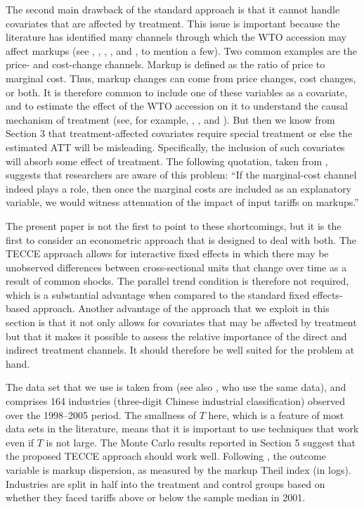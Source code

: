 \documentclass[12pt,fleqn]{article}
\begin{document}
  The second main drawback of the standard approach is that it cannot handle covariates that are affected by treatment. This issue is important because the literature has identified many channels through which the WTO accession may affect markups (see \citealp{Mao_Xu_2019}, \citealp{Fan_etal_2018}, \citealp{Deng_etal_2018}, \citealp{Liu_Ma_2021}, and \citealp{Brandt_etal_2017}, to mention a few). Two common examples are the price- and cost-change channels. Markup is defined as the ratio of price to marginal cost. Thus, markup changes can come from price changes, cost changes, or both. It is therefore common to include one of these variables as a covariate, and to estimate the effect of the WTO accession on it to understand the causal mechanism of treatment (see, for example, \citealp{Mao_Xu_2019}, \citealp{Fan_etal_2018}, and \citealp{lu2015trade}). But then we know from Section 3 that treatment-affected covariates require special treatment or else the estimated ATT will be misleading. Specifically, the inclusion of such covariates will absorb some effect of treatment. The following quotation, taken from \citet[page 116]{Fan_etal_2018}, suggests that researchers are aware of this problem: ``If the marginal-cost channel indeed plays a role, then once the marginal costs are included as an explanatory variable, we would witness attenuation of the impact of input tariffs on markups.''
  
  The present paper is not the first to point to these shortcomings, but it is the first to consider an econometric approach that is designed to deal with both. The TECCE approach allows for interactive fixed effects in which there may be unobserved differences between cross-sectional units that change over time as a result of common shocks. The parallel trend condition is therefore not required, which is a substantial advantage when compared to the standard fixed effects-based approach. Another advantage of the approach that we exploit in this section is that it not only allows for covariates that may be affected by treatment but that it makes it possible to assess the relative importance of the direct and indirect treatment channels. It should therefore be well suited for the problem at hand.
  
  The data set that we use is taken from \citet{lu2015trade} (see also \citealp{Deng_etal_2018}, who use the same data), and comprises 164 industries (three-digit Chinese industrial classification) observed over the 1998--2005 period. The smallness of $T$ here, which is a feature of most data sets in the literature, means that it is important to use techniques that work even if $T$ is not large. The Monte Carlo results reported in Section 5 suggest that the proposed TECCE approach should work well. Following \citet{lu2015trade}, the outcome variable is markup dispersion, as measured by the markup Theil index (in logs). Industries are split in half into the treatment and control groups based on whether they faced tariffs above or below the sample median in 2001.
  
\end{document}
